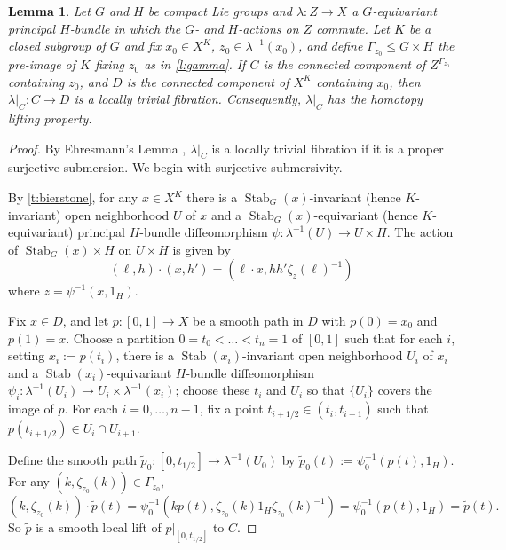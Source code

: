 \documentclass[12pt,reqno]{amsart}
\newcommand{\printname}[1]{}
\renewcommand{\printname}[1]
	{{\color{brown}{\makebox[0pt]{\hspace{-1in}\raisebox{8pt}{\tiny #1}}}}}
\newcommand{\labell}[1]{\label{#1} \printname{#1}}
\newcommand{\Stab}{{\operatorname{Stab}}} %
\theoremstyle{plain}
\newtheorem{lemma}[theorem]{Lemma}
\theoremstyle{definition}
\begin{document}
    \begin{lemma}\labell{l:lifting}
        Let $G$ and $H$ be compact Lie groups and $\lambda\colon Z\to X$ a $G$-equivariant principal $H$-bundle in which the $G$- and $H$-actions on $Z$ commute.  Let $K$ be a closed subgroup of $G$ and fix $x_0\in X^K$, $z_0\in\lambda^{-1}(x_0)$, and  define  $\Gamma_{z_0} \leq G \times H$ the pre-image of $K$ fixing $z_0$ as in  \cref{l:gamma}. If $C$ is the connected component of $Z^{\Gamma_{z_0}}$ containing $z_0$, and $D$ is the connected component of $X^K$ containing $x_0$, then $\lambda|_C\colon C\to D$ is a locally trivial fibration.  Consequently, $\lambda|_C$ has the homotopy lifting property.
    \end{lemma}

    \begin{proof}
        By Ehresmann's Lemma \cite{ehresmann}, $\lambda|_C$ is a locally trivial fibration if it is a proper surjective submersion.  We begin with surjective submersivity.

        By \cref{t:bierstone}, for any $x\in X^K$ there is a $\Stab_G(x)$-invariant (hence $K$-invariant) open neighborhood $U$ of $x$ and a $\Stab_G(x)$-equivariant (hence $K$-equivariant) principal $H$-bundle diffeomorphism $\psi\colon\lambda^{-1}(U)\to U\times H$.    The action of $\Stab_G(x)\times H$ on $U\times H$ is given by 
        $$(\ell,h)\cdot(x,h')=\left(\ell\cdot x,hh'\zeta_{z}(\ell)^{-1}\right)$$
where $z=\psi^{-1}(x,1_H)$. 
        
        Fix $x\in D$, and let $p\colon[0,1]\to X$ be a smooth path in $D$ with $p(0)=x_0$ and $p(1)=x$.  Choose a partition $0=t_0<\dots<t_n=1$ of $[0,1]$ such that for each $i$, setting $x_i:=p(t_i)$, there is a $\Stab(x_i)$-invariant open neighborhood $U_i$ of $x_i$ and a $\Stab(x_i)$-equivariant $H$-bundle diffeomorphism $\psi_i\colon\lambda^{-1}(U_i)\to U_i\times\lambda^{-1}(x_i)$; choose these $t_i$ and $U_i$ so that $\{U_i\}$ covers the image of $p$.  For each $i=0,\dots,n-1$, fix a point $t_{i+1/2}\in(t_i,t_{i+1})$ such that $p(t_{i+1/2})\in U_i\cap U_{i+1}$.
        
        Define the smooth path $\widetilde{p}_0\colon[0,t_{1/2}]\to \lambda^{-1}(U_0)$ by $\widetilde{p}_0(t):=\psi_0^{-1}(p(t),1_H)$.  For any $(k,\zeta_{z_0}(k))\in\Gamma_{z_0}$, $$(k,\zeta_{z_0}(k))\cdot\widetilde{p}(t)=\psi_0^{-1}(kp(t),\zeta_{z_0}(k)1_H\zeta_{z_0}(k)^{-1})=\psi_0^{-1}(p(t),1_H)=\widetilde{p}(t).$$  So $\widetilde{p}$ is a smooth local lift of $p|_{[0,t_{1/2}]}$ to $C$.
        

\end{proof}
\end{document}
